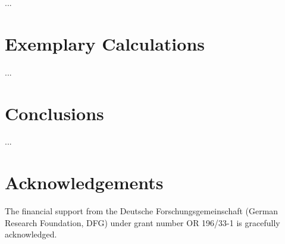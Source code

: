 \documentclass{svproc}
\begin{document}
...

\section{Exemplary Calculations}

...

\section{Conclusions}
\label{sec:Conclusion}

...

\section*{Acknowledgements}

The financial support from the Deutsche Forschungsgemeinschaft (German Research Foundation, DFG) under grant number OR 196/33-1 is gracefully acknowledged.



\end{document}
